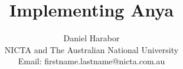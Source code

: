 \documentclass[letterpaper]{article}
\begin{document}
\title{Implementing Anya}
\author{
Daniel Harabor \\
NICTA and The Australian National University \\
Email: firstname.lastname@nicta.com.au
}
\date{}

\maketitle













\end{document}
